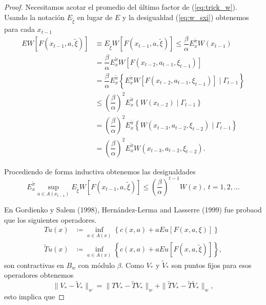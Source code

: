 \documentclass[11pt, spanish]{amsart}
\begin{document}
\begin{proof}
Necesitamos acotar el promedio del último factor de (\ref{eq:trick_w}).
Usando la notación $E_{\widetilde{\xi}}$ en lugar de $E$ y la desigualdad
(\ref{eq:w_sxi}) obtenemos para cada $x_{t-1}$ 
\begin{align*}
EW\left[F\left(x_{t-1},a,\widetilde{\xi}\right)\right] & \equiv E_{\widetilde{\xi}}W\left[F\left(x_{t-1},a,\widetilde{\xi}\right)\right]\leq\dfrac{\beta}{\alpha}E_{x}^{\widetilde{\pi}}W\left(x_{t-1}\right)\\
 & =\dfrac{\beta}{\alpha}E_{x}^{\widetilde{\pi}}W\left[F\left(x_{t-2},a_{t-1},\xi_{t-1}\right)\right]\\
 & =\dfrac{\beta}{\alpha}E_{x}^{\widetilde{\pi}}\left\{ E_{x}^{\widetilde{\pi}}W\left[F\left(x_{t-2},a_{t-1},\xi_{t-1}\right)\right]\mid\Gamma_{t-1}\right\} \\
 & \leq\left(\dfrac{\beta}{\alpha}\right)^{2}E_{x}^{\widetilde{\pi}}\left\{ W\left(x_{t-2}\right)\mid\Gamma_{t-1}\right\} \\
 & =\left(\dfrac{\beta}{\alpha}\right)^{2}E_{x}^{\widetilde{\pi}}\left\{ W\left(x_{t-3},a_{t-2},\xi_{t-2}\right)\mid\Gamma_{t-1}\right\} \\
 & =\left(\dfrac{\beta}{\alpha}\right)^{2}E_{x}^{\widetilde{\pi}}W\left(x_{t-3},a_{t-2},\xi_{t-2}\right).
\end{align*}

Procediendo de forma inductiva obtenemos las desigualdades 
\begin{equation}
E_{x}^{\widetilde{\pi}}\sup_{a\in A\left(x_{t-1}\right)}E_{\widetilde{\xi}}W\left[F\left(x_{t-1},a,\widetilde{\xi}\right)\right]\leq\left(\dfrac{\beta}{\alpha}\right)^{t-1}W\left(x\right),\ t=1,2,\ldots\label{eq:super_inequality}
\end{equation}

En Gordienko y Salem (1998), Hernández-Lerma and Lasserre (1999) fue
probaod que los siguientes operadores. 
\begin{align*}
Tu\left(x\right) & \coloneqq\inf_{a\in A\left(x\right)}\left\{ c\left(x,a\right)+aEu\left[F\left(x,a,\xi\right)\right]\right\} \\
\widetilde{T}u\left(x\right) & \coloneqq\inf_{a\in A\left(x\right)}\left\{ c\left(x,a\right)+aEu\left[F\left(x,a,\widetilde{\xi}\right)\right]\right\} ,
\end{align*}
son contractivas en $B_{w}$ con módulo $\beta$. Como $V_{*}$ y
$\widetilde{V}_{*}$ son puntos fijos para esos operadores obtenemos
\[
\|V_{*}-\widetilde{V}_{*}\|_{w}=\|TV_{*}-\widetilde{T}V_{*}\|_{w}+\|\widetilde{T}V_{*}-\widetilde{T}\widetilde{V}_{*}\|_{w},
\]
 esto implica que


\end{proof}
\end{document}
